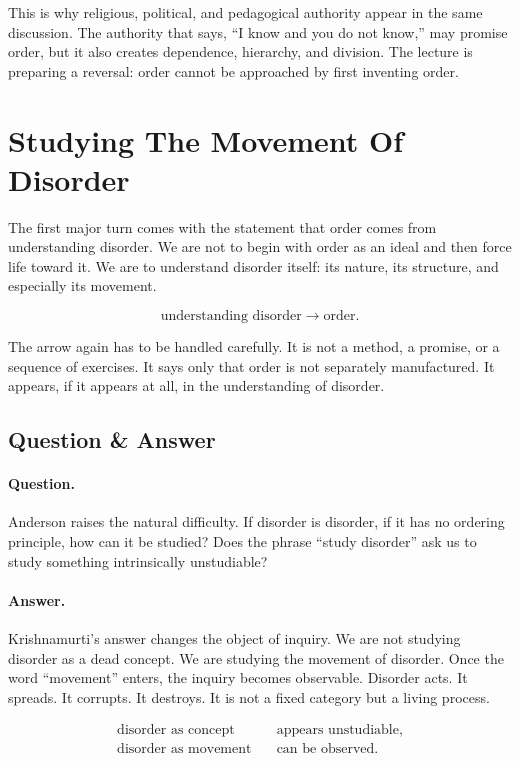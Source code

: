 This is why religious, political, and pedagogical authority appear in the same discussion. The authority that says, ``I know and you do not know,'' may promise order, but it also creates dependence, hierarchy, and division. The lecture is preparing a reversal: order cannot be approached by first inventing order.

\section{Studying The Movement Of Disorder}

The first major turn comes with the statement that order comes from understanding disorder. We are not to begin with order as an ideal and then force life toward it. We are to understand disorder itself: its nature, its structure, and especially its movement.

\begin{equation}
\text{understanding disorder}
\longrightarrow
\text{order}.
\end{equation}

The arrow again has to be handled carefully. It is not a method, a promise, or a sequence of exercises. It says only that order is not separately manufactured. It appears, if it appears at all, in the understanding of disorder.

\subsection{Question \& Answer}

\paragraph{Question.}
Anderson raises the natural difficulty. If disorder is disorder, if it has no ordering principle, how can it be studied? Does the phrase ``study disorder'' ask us to study something intrinsically unstudiable?

\paragraph{Answer.}
Krishnamurti's answer changes the object of inquiry. We are not studying disorder as a dead concept. We are studying the movement of disorder. Once the word ``movement'' enters, the inquiry becomes observable. Disorder acts. It spreads. It corrupts. It destroys. It is not a fixed category but a living process.

\begin{align}
\text{disorder as concept} &\quad \text{appears unstudiable},\\
\text{disorder as movement} &\quad \text{can be observed}.
\end{align}

